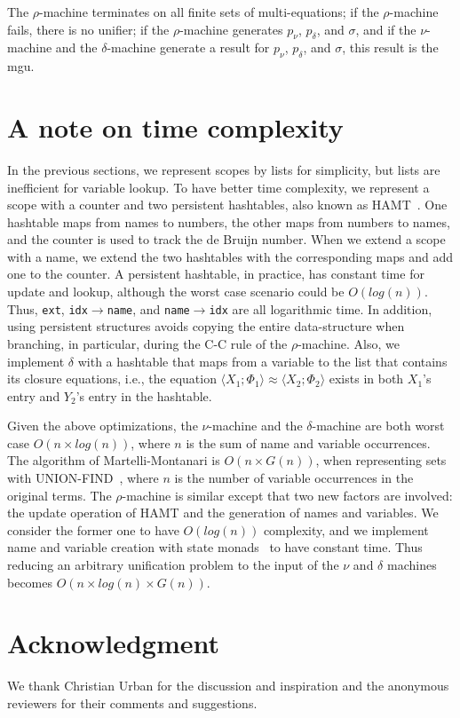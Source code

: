 \documentclass[a4paper,UKenglish]{lipics-v2016}
\newcommand{\clos}[2] {
  \langle #1; #2 \rangle
}
\newcommand{\aeq}[4] {
  \clos{#1}{#2} \approx \clos{#3}{#4}
}
\newcommand*{\transname}[1]{\textsc{#1}}
\begin{document}
\begin{conjecture}\label{lemma:rmachine}
  The $\rho$-machine terminates on all finite sets of multi-equations;
  if the $\rho$-machine fails, there is no unifier;
  if the $\rho$-machine generates $p_\nu$, $p_\delta$, and $\sigma$,
  and if the $\nu$-machine and the $\delta$-machine generate a result for
  $p_\nu$, $p_\delta$, and $\sigma$, this result is the mgu.
  \end{conjecture}

\section{A note on time complexity}
    \label{efficiency}

In the previous sections, we represent scopes by lists for simplicity,
but lists are inefficient for variable lookup.  To have better time
complexity, we represent a scope with a counter and two persistent
hashtables, also known as HAMT~\citep{bagwell_ideal_2001}.  One
hashtable maps from names to numbers, the other maps from numbers to
names, and the counter is used to track the de Bruijn number.  When we
extend a scope with a name, we extend the two hashtables with the
corresponding maps and add one to the counter.  A persistent
hashtable, in practice, has constant time for update and lookup,
although the worst case scenario could be $O(log(n))$.  Thus,
\texttt{ext}, \texttt{idx$\rightarrow$name}, and
\texttt{name$\rightarrow$idx} are all logarithmic time.  In addition,
using persistent structures avoids copying the entire data-structure
when branching, in particular, during the \transname{C-C} rule of
the $\rho$-machine.
Also, we implement $\delta$ with a hashtable that maps from a variable to
the list that contains its closure equations,
i.e., the equation $\aeq{X_1}{\Phi_1}{X_2}{\Phi_2}$
exists in both $X_1$'s entry and $Y_2$'s entry in the hashtable.

Given the above optimizations, the $\nu$-machine and the
$\delta$-machine are both worst case $O(n \times log(n))$,
where $n$ is the sum of name and variable occurrences.
The algorithm of Martelli-Montanari is $O(n \times G(n))$, when
representing sets with UNION-FIND~\citep{tarjan_efficiency_1975}, where
$n$ is the number of variable occurrences in the original terms.  The
$\rho$-machine is similar except that two new factors are involved:
the update operation of HAMT and the generation of names and
variables.  We consider the former one to have $O(log(n))$ complexity,
and we implement name and variable creation with state
monads~\citep{moggi_notions_1991} to have
constant time.  Thus reducing an arbitrary unification problem to the
input of the $\nu$ and $\delta$ machines becomes $O(n \times log(n) \times
G(n))$.

\section*{Acknowledgment}
We thank Christian Urban for the discussion and inspiration
and the anonymous reviewers for their comments and suggestions.


\end{document}
